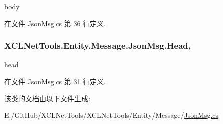 body 



在文件 Json\+Msg.\+cs 第 36 行定义.

\subsubsection[{\texorpdfstring{Head}{Head}}]{ X\+C\+L\+Net\+Tools.\+Entity.\+Message.\+Json\+Msg.\+Head\hspace{0.3cm}{\ttfamily [get]}, {\ttfamily [set]}}\hypertarget{class_x_c_l_net_tools_1_1_entity_1_1_message_1_1_json_msg_a563af2b66f8c22c04ff557cfe34f2479}{}\label{class_x_c_l_net_tools_1_1_entity_1_1_message_1_1_json_msg_a563af2b66f8c22c04ff557cfe34f2479}


head 



在文件 Json\+Msg.\+cs 第 31 行定义.



该类的文档由以下文件生成\+:\begin{DoxyCompactItemize}
\item 
E\+:/\+Git\+Hub/\+X\+C\+L\+Net\+Tools/\+X\+C\+L\+Net\+Tools/\+Entity/\+Message/\hyperlink{_json_msg_8cs}{Json\+Msg.\+cs}\end{DoxyCompactItemize}
